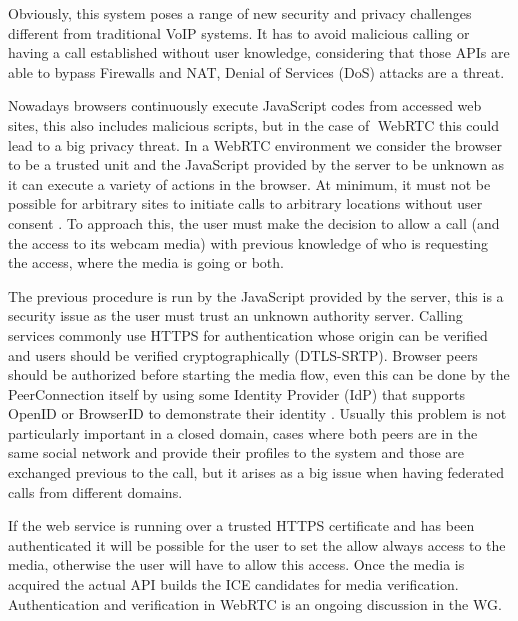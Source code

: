 Obviously, this system poses a range of new security and privacy challenges different from traditional VoIP systems. It has to avoid malicious calling or having a call established without user knowledge, considering that those APIs are able to bypass Firewalls and NAT, Denial of Services (DoS) attacks are a threat.

Nowadays browsers continuously execute JavaScript codes from accessed web sites, this also includes malicious scripts, but in the case of WebRTC this could lead to a big privacy threat. In a WebRTC environment we consider the browser to be a trusted unit and the JavaScript provided by the server to be unknown as it can execute a variety of actions in the browser. At minimum, it must not be possible for arbitrary sites to initiate calls to arbitrary locations without user consent \cite{rtcwebSecurityIETF}. To approach this, the user must make the decision to allow a call (and the access to its webcam media) with previous knowledge of who is requesting the access, where the media is going or both.

The previous procedure is run by the JavaScript provided by the server, this is a security issue as the user must trust an unknown authority server. Calling services commonly use HTTPS for authentication whose origin can be verified and users should be verified cryptographically (DTLS-SRTP). Browser peers should be authorized before starting the media flow, even this can be done by the PeerConnection itself by using some Identity Provider (IdP) that supports OpenID or BrowserID to demonstrate their identity \cite{rtcwebSecurityArchIETF}. Usually this problem is not particularly important in a closed domain, cases where both peers are in the same social network and provide their profiles to the system and those are exchanged previous to the call, but it arises as a big issue when having federated calls from different domains.

If the web service is running over a trusted HTTPS certificate and has been authenticated it will be possible for the user to set the allow always access to the media, otherwise the user will have to allow this access. Once the media is acquired the actual API builds the ICE candidates for media verification. Authentication and verification in WebRTC is an ongoing discussion in the WG.

